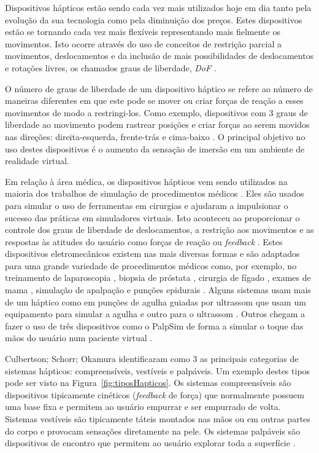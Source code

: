 Dispositivos hápticos estão sendo cada vez mais utilizados hoje em dia tanto pela evolução da sua tecnologia como pela diminuição dos preços. Estes dispositivos estão se tornando cada vez mais flexíveis representando mais fielmente os movimentos. Isto ocorre  através do uso de conceitos de restrição parcial a movimentos, deslocamentos e da inclusão de mais possibilidades de deslocamentos e rotações livres, os chamados graus de liberdade, \textit{\acrfull{DoF}} \cite{Chen2022}.


O número de graus de liberdade de um dispositivo háptico se refere ao número de maneiras diferentes em que este pode se mover ou criar forças de reação a esses movimentos de modo a restringi-los. Como exemplo, dispositivos com 3 graus de liberdade ao movimento podem rastrear posições e criar forças ao serem movidos nas direções: direita-esquerda, frente-trás e cima-baixo \cite{HAPTICSHOUSE2019}. O principal objetivo no uso destes dispositivos é o aumento da sensação de imersão em um ambiente de realidade virtual. 

Em relação à área médica, os dispositivos hápticos vem sendo utilizados na maioria dos trabalhos de simulação de procedimentos médicos \cite{Escobar-Castillejos2016, Moo-Young2021}. Eles são usados para simular o uso de ferramentas em cirurgias e ajudaram a impulsionar o sucesso das práticas em simuladores virtuais. Isto aconteceu ao proporcionar o controle dos graus de liberdade de deslocamentos, a restrição aos movimentos e as respostas às atitudes do usuário como forças de reação ou \textit{feedback} \cite{Gerovich2004}. Estes dispositivos eletromecânicos existem nas mais diversas formas e são adaptados para uma grande variedade de procedimentos médicos como, por exemplo, no treinamento de laparoscopia \cite{Srinivasan2004}, biopsia de próstata \cite{Sclaverano2009}, cirurgia de fígado \cite{Mastmeyer2016}, exames de mama \cite{Brazil2017,Jeon2010,Ribeiro2014,Solanki2010}, simulação de apalpação \cite{Ribeiro2016} e punções epidurais \cite{N.2013, Brazil2018}. Alguns sistemas usam mais de um háptico como em punções de agulha guiadas por ultrassom que usam um equipamento para simular a agulha e outro para o ultrassom \cite{Ni2011,Vidal2008}. Outros chegam a fazer o uso de três dispositivos como o PalpSim de forma a simular o toque das mãos do usuário num paciente virtual \cite{Coles2011b}. 

Culbertson; Schorr; Okamura \cite{Culbertson2018} identificaram como 3 as principais categorias de sistemas hápticos: compreensíveis, vestíveis e palpáveis. Um exemplo  destes tipos pode ser visto na Figura~\ref{fig:tiposHapticos}. Os sistemas compreensíveis são dispositivos tipicamente cinéticos (\textit{feedback} de força) que normalmente possuem uma base fixa e permitem ao usuário empurrar e ser empurrado de volta. Sistemas vestíveis são tipicamente táteis montados nas mãos ou em outras partes do corpo e provocam sensações diretamente na pele. Os sistemas palpáveis são dispositivos de encontro que permitem ao usuário explorar toda a superfície \cite{Culbertson2018}. 


